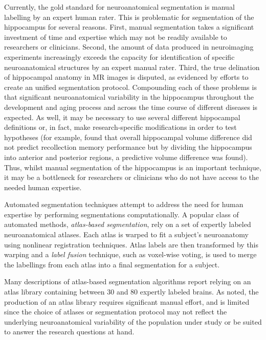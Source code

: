 \documentclass{article}
\begin{document}
Currently, the gold standard for neuroanatomical segmentation is manual
labelling by an expert human rater.  This is problematic for segmentation of
the hippocampus for several reasons.  First, manual segmentation takes a
significant investment of time and expertise \cite{Hammers2003} which may not
be readily available to researchers or clinicians.  Second, the amount of data
produced in neuroimaging experiments increasingly exceeds the capacity for
identification of specific neuroanatomical structures by an expert manual
rater.  Third, the true delination of hippocampal anatomy in MR images is
disputed\cite{Geuze2004}, as evidenced by efforts to create an unified
segmentation protocol\cite{Jack2011}.  Compounding each of these problems is
that significant neuroanatomical variability in the hippocampus throughout the
development and aging process and across the time course of different diseases
is expected. As well, it may be necessary to use several different hippocampal
definitions or, in fact, make research-specific modifications in order to test
hypotheses (for example, \cite{Poppenk2011} found that overall hippocampal
volume difference did not predict recollection memory performance but by
dividing the hippocampus into anterior and posterior regions, a predictive
volume difference was found).  Thus, whilst manual segmentation of the
hippocampus is an important technique, it may be a bottleneck for researchers
or clinicians who do not have access to the needed human expertise.

Automated segmentation techniques attempt to address the need for human
expertise by performing segmentations computationally.  A popular class of
automated methods, {\it atlas-based segmentation}, rely on a set of expertly
labeled neuroanatomical atlases.  Each atlas is warped to fit a subject's
neuroanatomy using nonlinear registration
techniques\cite{Collins1995,Klein2009}.  Atlas labels are then transformed by
this warping and a {\it label fusion} technique, such as voxel-wise voting, is
used to merge the labellings from each atlas into a final segmentation for a
subject.  

Many descriptions of atlas-based segmentation algorithms report relying on an
atlas library containing between 30 and 80 expertly labeled
brains\cite{Heckemann2011,Collins2010,Aljabar2009,Leung2010,Lotjonen2010}.
As noted, the production of an atlas library requires significant manual
effort, and is limited since the choice of atlases or segmentation protocol may
not reflect the underlying neuroanatomical variability of the population under
study or be suited to answer the research questions at hand.
\end{document}
